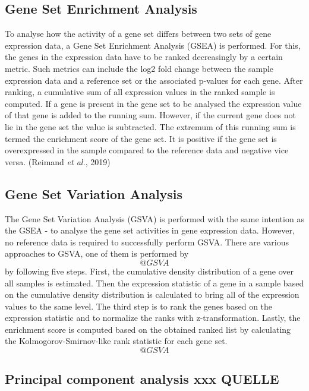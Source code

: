 \documentclass[
  parskip,
  oneside]{scrreprt}
\begin{document}
\hypertarget{gene-set-enrichment-analysis}{%
\subsection{Gene Set Enrichment
Analysis}\label{gene-set-enrichment-analysis}}

To analyse how the activity of a gene set differs between two sets of
gene expression data, a Gene Set Enrichment Analysis (GSEA) is
performed. For this, the genes in the expression data have to be ranked
decreasingly by a certain metric. Such metrics can include the log2 fold
change between the sample expression data and a reference set or the
associated p-values for each gene. After ranking, a cumulative sum of
all expression values in the ranked sample is computed. If a gene is
present in the gene set to be analysed the expression value of that gene
is added to the running sum. However, if the current gene does not lie
in the gene set the value is subtracted. The extremum of this running
sum is termed the enrichment score of the gene set. It is positive if
the gene set is overexpressed in the sample compared to the reference
data and negative vice versa. (Reimand \emph{et al.}, 2019)

\hypertarget{gene-set-variation-analysis}{%
\subsection{Gene Set Variation
Analysis}\label{gene-set-variation-analysis}}

The Gene Set Variation Analysis (GSVA) is performed with the same
intention as the GSEA - to analyse the gene set activities in gene
expression data. However, no reference data is required to successfully
perform GSVA. There are various approaches to GSVA, one of them is
performed by \[@GSVA\] by following five steps. First, the cumulative
density distribution of a gene over all samples is estimated. Then the
expression statistic of a gene in a sample based on the cumulative
density distribution is calculated to bring all of the expression values
to the same level. The third step is to rank the genes based on the
expression statistic and to normalize the ranks with z-transformation.
Lastly, the enrichment score is computed based on the obtained ranked
list by calculating the Kolmogorov-Smirnov-like rank statistic for each
gene set. \[@GSVA\]

\hypertarget{principal-component-analysis-xxx-quelle}{%
\subsection{Principal component analysis xxx
QUELLE}\label{principal-component-analysis-xxx-quelle}}
\end{document}
